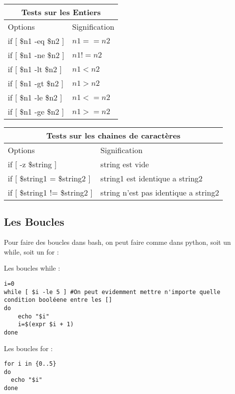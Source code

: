 \documentclass{article}
\begin{document}
\medskip

\begin{tabular}{ |p{4cm}||p{4cm}| }
 \hline
 \multicolumn{2}{|c|}{Tests sur les Entiers} \\
 \hline
  Options & Signification \\
 \hline
  if [ \$n1 -eq \$n2 ] & $n1 == n2$\\
 \hline
  if [ \$n1 -ne \$n2 ] & $n1 != n2$\\
 \hline
  if [ \$n1 -lt \$n2 ] & $n1 < n2$\\
 \hline
  if [ \$n1 -gt \$n2 ] & $n1 > n2$\\
 \hline
  if [ \$n1 -le \$n2 ] & $n1 <= n2$\\
 \hline
  if [ \$n1 -ge \$n2 ] & $n1 >= n2$\\
 \hline
\end{tabular}

\medskip

\begin{tabular}{ |p{4cm}||p{4cm}| }
 \hline
 \multicolumn{2}{|c|}{Tests sur les chaines de caractères} \\
 \hline
  Options & Signification \\
 \hline
  if [ -z \$string ] & string est vide\\
 \hline
  if [ \$string1 = \$string2 ] & string1 est identique a string2\\
 \hline
  if [ \$string1 != \$string2 ] & string n'est pas identique a string2\\
 \hline
\end{tabular}

\subsection{Les Boucles}

Pour faire des boucles dans bash, on peut faire comme dans python, soit un while, soit un for :

Les boucles while :

\begin{verbatim}
i=0
while [ $i -le 5 ] #On peut evidemment mettre n'importe quelle condition booléene entre les []
do
    echo "$i"
    i=$(expr $i + 1)
done
\end{verbatim}

Les boucles for :

\begin{verbatim}
for i in {0..5}
do
  echo "$i"
done
\end{verbatim}
\end{document}
